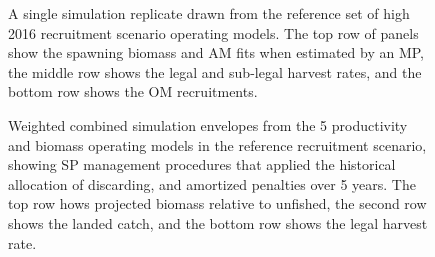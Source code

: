 \documentclass[11pt]{book}
\begin{document}
\begin{landscape}
\begin{figure}[htb]
{}

\caption{A single simulation replicate drawn from the reference set of high 2016 recruitment scenario operating models. The top row of panels show the spawning biomass and AM fits when estimated by an MP, the middle row shows the legal and sub-legal harvest rates, and the bottom row shows the OM recruitments.}\label{fig:unnamed-chunk-18}
\end{figure}
\newpage
\begin{figure}[htb]

{\centering {} 

}

\caption{Weighted combined simulation envelopes from the 5 productivity and biomass operating models in the reference recruitment scenario, showing SP management procedures that applied the historical allocation of discarding, and amortized penalties over 5 years. The top row hows projected biomass relative to unfished, the second row shows the landed catch, and the bottom row shows the legal harvest rate.}\label{fig:unnamed-chunk-20}
\end{figure}
\newpage
\begin{figure}[htb]

{\centering {} 

}
\end{figure}
\end{landscape}
\end{document}
